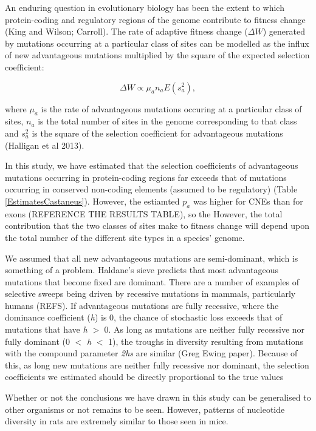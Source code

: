 \documentclass[11pt]{article}
\begin{document}
An enduring question in evolutionary biology has been the extent to which protein-coding and regulatory regions of the genome contribute to fitness change (King and Wilson; Carroll). The rate of adaptive fitness change ($\Delta W$) generated by mutations occurring at a particular class of sites can be modelled as the influx of new advantageous mutations multiplied by the square of the expected selection coefficient:

\begin{equation}
\label{eq:fitness}
\Delta W \propto \mu_a n_a E(s_a^2),
\end{equation}

where $\mu_a$ is the rate of advantageous mutations occuring at a particular class of sites, \textit{$n_a$} is the total number of sites in the genome corresponding to that class and \textit{$s_a^2$} is the square of the selection coefficient for advantageous mutations (Halligan et al 2013). 

In this study, we have estimated that the selection coefficients of advantageous mutations occurring in protein-coding regions far exceeds that of mutations occurring in conserved non-coding elements (assumed to be regulatory) (Table \ref{EstimatesCastaneus}). However, the estiamted $p_a$ was higher for CNEs than for exons (REFERENCE THE RESULTS TABLE), so the 
However, the total contribution that the two classes of sites make to fitness change will depend upon the total number of the different site types in a species' genome. 



We assumed that all new advantageous mutations are semi-dominant, which is something of a problem. Haldane's sieve predicts that most advantageous mutations that become fixed are dominant. There are a number of examples of selective sweeps being driven by recessive mutations in mammals, particularly humans (REFS). If advantageous mutations are fully recessive, where the dominance coefficient (\textit{h}) is 0, the chance of stochastic loss exceeds that of mutations that have \textit{h} $>$ 0. As long as mutations are neither fully recessive nor fully dominant (0 $<$ \textit{h} $<$ 1), the troughs in diversity resulting from mutations with the compound parameter \textit{2hs} are similar (Greg Ewing paper). Because of this, as long new mutations are neither fully recessive nor dominant, the selection coefficients we estimated should be directly proportional to the true values

Whether or not the conclusions we have drawn in this study can be generalised to other organisms or not remains to be seen. However, patterns of nucleotide diversity in rats are extremely similar to those seen in mice.
\end{document}
